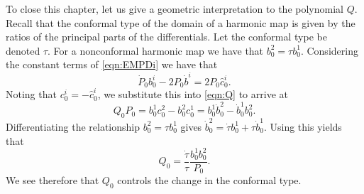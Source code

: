 To close this chapter, let us give a geometric interpretation to the polynomial $Q$. Recall that the conformal type of the domain of a harmonic map is given by the ratios of the principal parts of the differentials. Let the conformal type be denoted $τ$. For a nonconformal harmonic map we have that $b^2_0 = τ b^1_0$. Considering the constant terms of \eqref{eqn:EMPDi} we have that
\[
\dot{P}_0b^i_0 -2P_0 \dot{b}^i = 2P_0\hat{c}^i_0.
\]
Noting that $c^i_0 = - \hat{c}^i_0$, we substitute this into \eqref{eqn:Q} to arrive at
\[
Q_0 P_0 = b^1_0 c^2_0 - b^2_0 c^1_0 = b^1_0 \dot{b}^2_0 - \dot{b}^1_0 b^2_0.
\]
Differentiating the relationship $b^2_0 = τ b^1_0$ gives $\dot{b}^2_0 = \dot{τ} b^1_0 + τ \dot{b}^1_0$. Using this yields that
\[
Q_0 = \frac{\dot{τ}}{τ} \frac{b^1_0 b^2_0}{P_0}.
\]
We see therefore that $Q_0$ controls the change in the conformal type.

